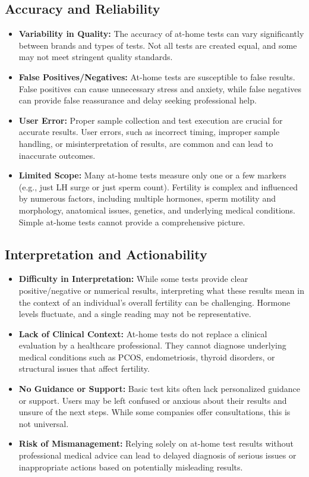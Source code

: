\documentclass{article}
\begin{document}
\subsection{Accuracy and Reliability}
\begin{itemize}
    \item \textbf{Variability in Quality:} The accuracy of at-home tests can vary significantly between brands and types of tests. Not all tests are created equal, and some may not meet stringent quality standards.
    \item \textbf{False Positives/Negatives:} At-home tests are susceptible to false results. False positives can cause unnecessary stress and anxiety, while false negatives can provide false reassurance and delay seeking professional help.
    \item \textbf{User Error:} Proper sample collection and test execution are crucial for accurate results. User errors, such as incorrect timing, improper sample handling, or misinterpretation of results, are common and can lead to inaccurate outcomes.
    \item \textbf{Limited Scope:} Many at-home tests measure only one or a few markers (e.g., just LH surge or just sperm count). Fertility is complex and influenced by numerous factors, including multiple hormones, sperm motility and morphology, anatomical issues, genetics, and underlying medical conditions. Simple at-home tests cannot provide a comprehensive picture.
\end{itemize}

\subsection{Interpretation and Actionability}
\begin{itemize}
    \item \textbf{Difficulty in Interpretation:} While some tests provide clear positive/negative or numerical results, interpreting what these results mean in the context of an individual's overall fertility can be challenging. Hormone levels fluctuate, and a single reading may not be representative.
    \item \textbf{Lack of Clinical Context:} At-home tests do not replace a clinical evaluation by a healthcare professional. They cannot diagnose underlying medical conditions such as PCOS, endometriosis, thyroid disorders, or structural issues that affect fertility.
    \item \textbf{No Guidance or Support:} Basic test kits often lack personalized guidance or support. Users may be left confused or anxious about their results and unsure of the next steps. While some companies offer consultations, this is not universal.
    \item \textbf{Risk of Mismanagement:} Relying solely on at-home test results without professional medical advice can lead to delayed diagnosis of serious issues or inappropriate actions based on potentially misleading results.
\end{itemize}
\end{document}
